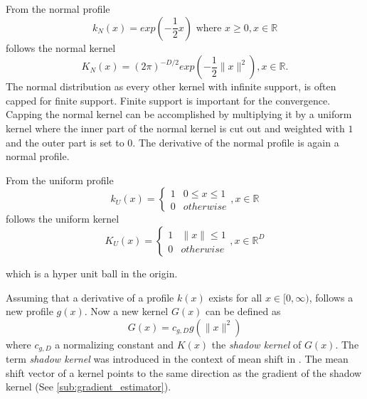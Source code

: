 From the normal profile
\begin{equation}\label{eq:nml}
	k_N(x) = exp \left( - \frac{1}{2} x \right) \textrm{ where } x \geq 0, x \in \mathbb{R}
\end{equation}
follows the normal kernel
\begin{equation}\label{eq:nmlk}
	K_N(x) = (2\pi)^{-D/2}exp\left( -\frac{1}{2} \lVert x \rVert^2 \right), x \in \mathbb{R}.
\end{equation}
The normal distribution as every other kernel with infinite support, is often
capped for finite support. Finite support is important for the convergence. Capping
the normal kernel can be accomplished by multiplying it by a uniform kernel where
the inner part of the normal kernel is cut out and weighted with $1$ and the 
outer part is set to $0$. The derivative of the normal profile is again a 
normal profile.

From the uniform profile 
\begin{equation}\label{eq:unf}
	k_U(x) = \begin{cases}
				1 &  0 \leq x \leq 1\\
				0 & \mathit{otherwise}
		\end{cases}, x \in \mathbb{R}
\end{equation}
follows the uniform kernel
\begin{equation}\label{eq:unfk}
	K_U(x) = \begin{cases}
				1 &  \lVert x \rVert  \leq 1\\
				0 & \mathit{otherwise}
		\end{cases}, x \in \mathbb{R}^D
\end{equation}

which is a hyper unit ball in the origin. 

Assuming that a derivative of a profile $k(x)$ exists for all $x \in [0, \infty)$, 
follows a new profile $g(x)$. Now a new kernel $G(x)$ can be defined as 
\begin{equation}\label{eq:shadowk}
	G(x) = c_{g,D}g(\lVert x \rVert^2)
\end{equation}
where $c_{g,D}$ a normalizing constant and $K(x)$ the \emph{shadow kernel} of 
$G(x)$. The term \emph{shadow kernel} was introduced in the context of mean 
shift in \citep{citeulike:2522867}. The mean shift vector of a kernel points to 
the same direction as the gradient of the shadow kernel (See \autoref{sub:gradient_estimator}). 



